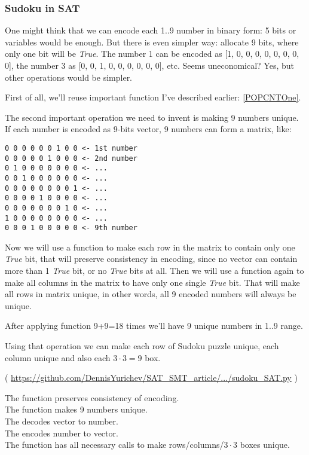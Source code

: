 \subsubsection{Sudoku in SAT}
\label{Sudoku_SAT}

One might think that we can encode each 1..9 number in binary form: 5 bits or variables would be enough.
But there is even simpler way: allocate 9 bits, where only one bit will be \textit{True}.
The number 1 can be encoded as [1, 0, 0, 0, 0, 0, 0, 0, 0], the number 3 as [0, 0, 1, 0, 0, 0, 0, 0, 0], etc.
Seems uneconomical? Yes, but other operations would be simpler.

First of all, we'll reuse important  function I've described earlier: \ref{POPCNTOne}.

The second important operation we need to invent is making 9 numbers unique.
If each number is encoded as 9-bits vector, 9 numbers can form a matrix, like:

\begin{lstlisting}
0 0 0 0 0 0 1 0 0 <- 1st number
0 0 0 0 0 1 0 0 0 <- 2nd number
0 1 0 0 0 0 0 0 0 <- ...
0 0 1 0 0 0 0 0 0 <- ...
0 0 0 0 0 0 0 0 1 <- ...
0 0 0 0 1 0 0 0 0 <- ...
0 0 0 0 0 0 0 1 0 <- ...
1 0 0 0 0 0 0 0 0 <- ...
0 0 0 1 0 0 0 0 0 <- 9th number
\end{lstlisting}

Now we will use a  function to make each row in the matrix to contain only one \textit{True} bit, that will
preserve consistency in encoding, since no vector can contain more than 1 \textit{True} bit, or no \textit{True} bits at all.
Then we will use a  function again to make all columns in the matrix to have only one single \textit{True} bit.
That will make all rows in matrix unique, in other words, all 9 encoded numbers will always be unique.

After applying  function 9+9=18 times we'll have 9 unique numbers in 1..9 range.

Using that operation we can make each row of Sudoku puzzle unique, each column unique and also each $3 \cdot 3=9$ box.


( \url{https://github.com/DennisYurichev/SAT_SMT_article/.../sudoku_SAT.py} )

The  function preserves consistency of encoding.\\
The  function makes 9 numbers unique.\\
The  decodes vector to number.\\
The  encodes number to vector.\\
The  function has all necessary calls to make rows/columns/$3\cdot 3$ boxes unique.

